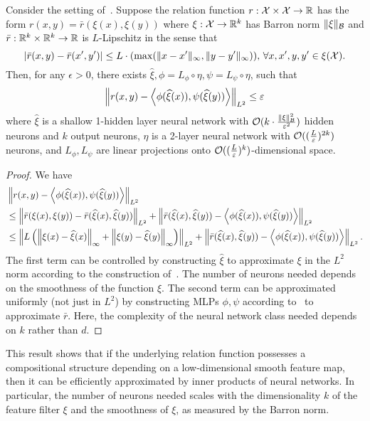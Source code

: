 \begin{corollary}
    Consider the setting of~. Suppose the relation function $r: {\mathcal{X}} \times {\mathcal{X}} \to \mathbb{R}$ has the form $r(x, y) = \bar{r}(\xi(x), \xi(y))$ where $\xi: {\mathcal{X}} \to \mathbb{R}^k$ has Barron norm $\lVert\xi\rVert_{\mathcal{B}}$ and $\bar{r}: \mathbb{R}^k \times \mathbb{R}^k \to \mathbb{R}$ is $L$-Lipschitz in the sense that $$\lvert\bar{r}(x, y) - \bar{r}(x', y')\rvert \leq L \cdot (\max(\lVert x - x'\rVert_\infty, \lVert y - y'\rVert_\infty)), \, \forall x,x',y,y' \in \xi({\mathcal{X}}).$$ Then, for any $\epsilon > 0$, there exists $\hat{\xi}, \phi = L_\phi \circ \eta, \psi = L_\psi \circ \eta$, such that
    \[\left\lVert r(x, y) - \left \langle \phi(\widehat{\xi}(x)), \psi(\widehat{\xi}(y)) \right\rangle\right\rVert_{L^2} \leq \varepsilon\]
    where $\hat{\xi}$ is a shallow 1-hidden layer neural network with ${\mathcal{O}}(k \cdot \frac{\lVert\xi\rVert_{{\mathcal{B}}}^2}{\varepsilon^2})$ hidden neurons and $k$ output neurons, $\eta$ is a 2-layer neural network with ${\mathcal{O}}((\frac{L}{\varepsilon})^{2 k})$ neurons, and $L_\phi, L_\psi$ are linear projections onto ${\mathcal{O}}((\frac{L}{\varepsilon})^{k})$-dimensional space.
\end{corollary}
\begin{proof}
    We have
    \begin{align*}
        &\left\lVert r(x, y) - \left \langle \phi(\widehat{\xi}(x)), \psi(\widehat{\xi}(y)) \right\rangle\right\rVert_{L^2} \\
        &\leq \left\lVert\bar{r}(\xi(x), \xi(y)) - \bar{r}(\widehat{\xi}(x), \widehat{\xi}(y))\right\rVert_{L^2} + \left\lVert\bar{r}(\widehat{\xi}(x), \widehat{\xi}(y)) - \left \langle \phi(\widehat{\xi}(x)), \psi(\widehat{\xi}(y)) \right\rangle\right\rVert_{L^2} \\
        &\leq \left\lVert L \left(\left\lVert\xi(x) - \widehat{\xi}(x)\right\rVert_{\infty} + \left\lVert\xi(y) - \widehat{\xi}(y)\right\rVert_{\infty}\right)\right\rVert_{L^2} 
        + \left\lVert\bar{r}(\widehat{\xi}(x), \widehat{\xi}(y)) - \left \langle \phi(\widehat{\xi}(x)), \psi(\widehat{\xi}(y)) \right\rangle\right\rVert_{L^2}.
    \end{align*}
    The first term can be controlled by constructing $\hat{\xi}$ to approximate $\xi$ in the $L^2$ norm according to the construction of~\textcite{barronUniversalApproximation1993}. The number of neurons needed depends on the smoothness of the function $\xi$. The second term can be approximated uniformly (not just in $L^2$) by constructing MLPs $\phi, \psi$ according to~ to approximate $\bar{r}$. Here, the complexity of the neural network class needed depends on $k$ rather than $d$.
\end{proof}

This result shows that if the underlying relation function possesses a compositional structure depending on a low-dimensional smooth feature map, then it can be efficiently approximated by inner products of neural networks. In particular, the number of neurons needed scales with the dimensionality $k$ of the feature filter $\xi$ and the smoothness of $\xi$, as measured by the Barron norm.